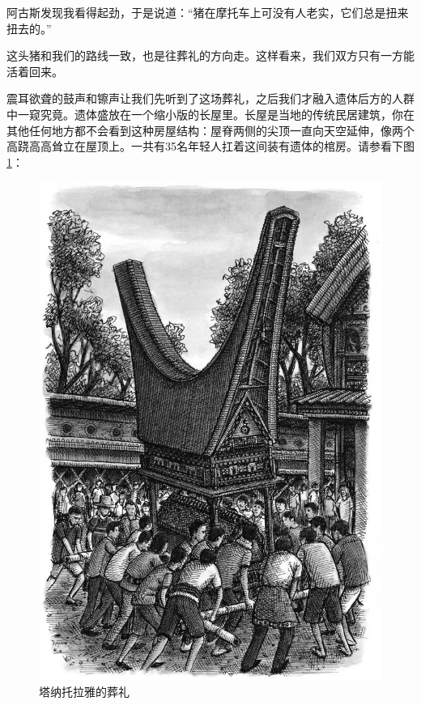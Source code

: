 \documentclass[12pt,oneside]{book}
\begin{document}
阿古斯发现我看得起劲，于是说道：“猪在摩托车上可没有人老实，它们总是扭来扭去的。”

这头猪和我们的路线一致，也是往葬礼的方向走。这样看来，我们双方只有一方能活着回来。

震耳欲聋的鼓声和镲声让我们先听到了这场葬礼，之后我们才融入遗体后方的人群中一窥究竟。遗体盛放在一个缩小版的长屋里。长屋是当地的传统民居建筑，你在其他任何地方都不会看到这种房屋结构：屋脊两侧的尖顶一直向天空延伸，像两个高跷高高耸立在屋顶上。一共有35名年轻人扛着这间装有遗体的棺房。请参看下图\ref{fig:ta_na_tuo_la_ya_de_zang_li}：

\begin{figure}[H]
\centering
\includegraphics[width=\linewidth ,totalheight=0.95\textheight , keepaspectratio]{塔纳托拉雅的葬礼.jpg}
\caption{塔纳托拉雅的葬礼}
\label{fig:ta_na_tuo_la_ya_de_zang_li}
\end{figure}
\end{document}
